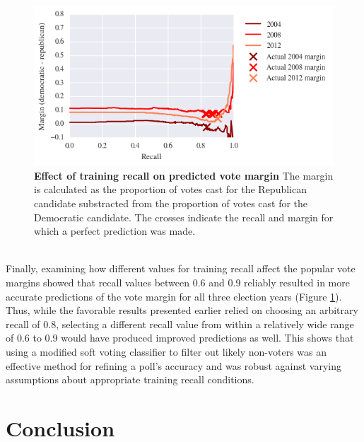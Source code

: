 \documentclass{article}
\begin{document}
	\begin{figure}[h!]
		\begin{center}
			\includegraphics*[width=0.8\linewidth]{recall_margin}
			\caption{\textbf{Effect of training recall on predicted vote margin} The margin is calculated as the proportion of votes cast for the Republican candidate substracted from the proportion of votes cast for the Democratic candidate. The crosses indicate the recall and margin for which a perfect prediction was made.}
			\label{fig:recall_margin}
		\end{center}
	\end{figure}
	\hfill \\
	Finally, examining how different values for training recall affect the popular vote margins showed that  recall values between 0.6 and 0.9 reliably resulted in more accurate predictions of the vote margin for all three election years (Figure \ref{fig:recall_margin}). Thus, while the favorable results presented earlier relied on choosing an arbitrary recall of 0.8, selecting a different recall value from within a relatively wide range of 0.6 to 0.9 would have produced improved predictions as well. This shows that using a modified soft voting classifier to filter out likely non-voters was an effective method for refining a poll's accuracy and was robust against varying assumptions about appropriate training recall conditions.
	
	\section{Conclusion}
	
\end{document}
